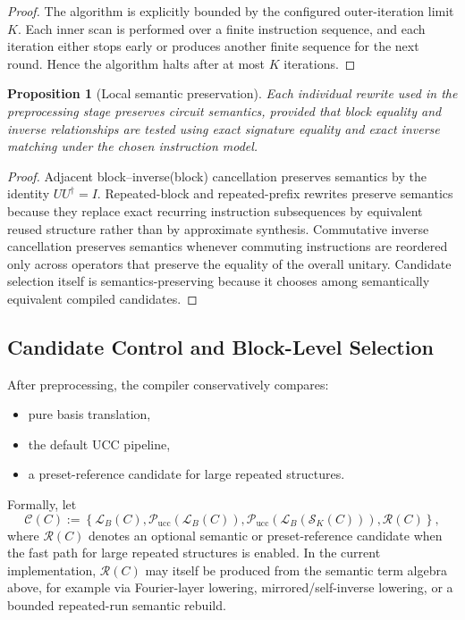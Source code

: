 \documentclass[11pt]{article}
\newtheorem{proposition}{Proposition}
\begin{document}
\begin{proof}
The algorithm is explicitly bounded by the configured outer-iteration limit $K$. Each inner scan is performed over a finite instruction sequence, and each iteration either stops early or produces another finite sequence for the next round. Hence the algorithm halts after at most $K$ iterations.
\end{proof}

\begin{proposition}[Local semantic preservation]
Each individual rewrite used in the preprocessing stage preserves circuit semantics, provided that block equality and inverse relationships are tested using exact signature equality and exact inverse matching under the chosen instruction model.
\end{proposition}

\begin{proof}
Adjacent block--inverse(block) cancellation preserves semantics by the identity $U U^\dagger = I$. Repeated-block and repeated-prefix rewrites preserve semantics because they replace exact recurring instruction subsequences by equivalent reused structure rather than by approximate synthesis. Commutative inverse cancellation preserves semantics whenever commuting instructions are reordered only across operators that preserve the equality of the overall unitary. Candidate selection itself is semantics-preserving because it chooses among semantically equivalent compiled candidates.
\end{proof}

\subsection{Candidate Control and Block-Level Selection}

After preprocessing, the compiler conservatively compares:
\begin{itemize}[leftmargin=1.5em]
    \item pure basis translation,
    \item the default UCC pipeline,
    \item a preset-reference candidate for large repeated structures.
\end{itemize}

Formally, let
\[
\mathcal{C}(C) :=
\left\{
\mathcal{L}_B(C),
\mathcal{P}_{\mathrm{ucc}}(\mathcal{L}_B(C)),
\mathcal{P}_{\mathrm{ucc}}(\mathcal{L}_B(\mathcal{S}_K(C))),
\mathcal{R}(C)
\right\},
\]
where $\mathcal{R}(C)$ denotes an optional semantic or preset-reference candidate when the fast path for large repeated structures is enabled. In the current implementation, $\mathcal{R}(C)$ may itself be produced from the semantic term algebra above, for example via Fourier-layer lowering, mirrored/self-inverse lowering, or a bounded repeated-run semantic rebuild.
\end{document}
